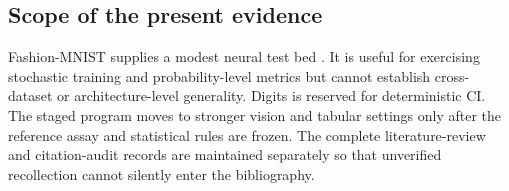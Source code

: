 \subsection{Scope of the present evidence}
Fashion-MNIST supplies a modest neural test bed \cite{xiao2017fashion}.  It is useful for
exercising stochastic training and probability-level metrics but cannot establish
cross-dataset or architecture-level generality.  Digits is reserved for deterministic CI.
The staged program moves to stronger vision and tabular settings only after the reference
assay and statistical rules are frozen.  The complete literature-review and citation-audit
records are maintained separately so that unverified recollection cannot silently enter
the bibliography.

